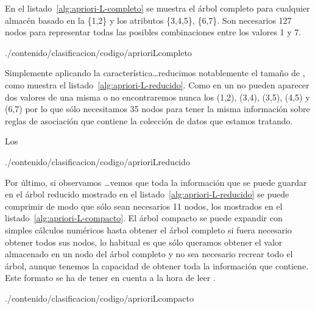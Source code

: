 En el listado~\ref{alg:apriori-L-completo} se muestra el árbol \aprioriL completo para cualquier almacén \D basado en la \clase \{1,2\} y los atributos \{3,4,5\}, \{6,7\}. Son necesarios 127 nodos para representar todas las posibles combinaciones entre los valores 1 y 7.

\afterpage{\clearpage}

                 {./contenido/clasificacion/codigo/aprioriLcompleto}


Simplemente aplicando la característica\ldots reducimos notablemente el tamaño de \aprioriL, como muestra el listado~\ref{alg:apriori-L-reducido}. Como en un \registro no pueden aparecer dos valores de una misma \clase o \atributo no encontraremos nunca los \itemsets (1,2), (3,4), (3,5), (4,5) y (6,7) por lo que sólo necesitamos 35 nodos para tener la misma información sobre reglas de asociación que contiene la colección de datos que estamos tratando. 

Los

\afterpage{\clearpage}

                 {./contenido/clasificacion/codigo/aprioriLreducido}

Por último, si observamos \ldots vemos que toda la información que se puede guardar en el árbol \aprioriL reducido mostrado en el listado~\ref{alg:apriori-L-reducido} se puede comprimir de modo que sólo sean necesarios 11 nodos, los mostrados en el listado~\ref{alg:apriori-L-compacto}. El árbol \aprioriL compacto se puede expandir con simples cálculos numéricos hasta obtener el árbol \aprioriL completo si fuera necesario obtener todos sus nodos, lo habitual es que sólo queramos obtener el valor almacenado en un nodo del árbol \aprioriL completo y no sea necesario recrear todo el árbol, aunque tenemos la capacidad de obtener toda la información que contiene. Este formato se ha de tener en cuenta a la hora de leer \D.

\afterpage{\clearpage}

                 {./contenido/clasificacion/codigo/aprioriLcompacto}

